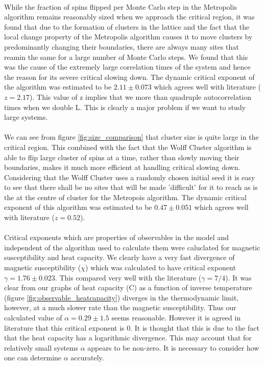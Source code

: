 \documentclass[12pt] {report} %
\begin{document}
	\paragraph{}
		While the fraction of spins flipped per Monte Carlo step in the Metropolis algorithm remains reasonably sized when we approach the critical region, it was found that due to the formation of clusters in the lattice and the fact that the local change property of the Metropolis algorithm causes it to move clusters by predominantly changing their boundaries, there are always many sites that reamin the same for a large number of Monte Carlo steps. We found that this was the cause of the extremely large correlation times of the system and hence the reason for its severe critical slowing down. The dynamic critical exponent of the algorithm was estimated to be $2.11 \pm 0.073$ which agrees well with literature ($z = 2.17$). This value of z implies that we more than quadruple autocorrelation times when we double L. This is clearly a major problem if we want to study large systems.
		
	\paragraph{}
		We can see from figure \ref{fig:size_comparison} that cluster size is quite large in the critical region. This combined with the fact that the Wolff Cluster algorithm is able to flip large cluster of spins at a time, rather than slowly moving their boundaries, makes it much more efficient at handling critical slowing down. Considering that the Wolff Cluster uses a randomly chosen initial seed it is easy to see that there shall be no sites that will be made 'difficult' for it to reach as is the at the centre of cluster for the Metropois algorithm. The dynamic critical exponent of this algorithm was estimated to be $0.47 \pm 0.051$ which agrees well with literature ($z = 0.52$).
		
	\paragraph{}
		Critical exponents which are properties of observables in the model and independent of the algorithm used to calculate them were caluclated for magnetic susceptibility and heat capacity. We clearly have a very fast divergence of magnetic susceptibility ($\chi$) which was calculated to have critical exponent $\gamma = 1.76 \pm 0.023$. This compared very well with the literature ($\gamma = 7/4$). It was clear from our graphs of heat capacity (C) as a function of inverse temperature (figure \ref{fig:observable_heatcapacity}) diverges in the thermodynamic limit, however, at a much slower rate than the magnetic susceptibility. Thus our calculated value of $\alpha = 0.29 \pm 1.5$ seems reasonable. However it is agreed in literature that this critical exponent is 0. It is thought that this is due to the fact that the heat capacity has a logarithmic divergence. This may account that for relatively small systems $\alpha$ appears to be non-zero. It is necessary to consider how one can determine $\alpha$ accurately.
		 
\end{document}
